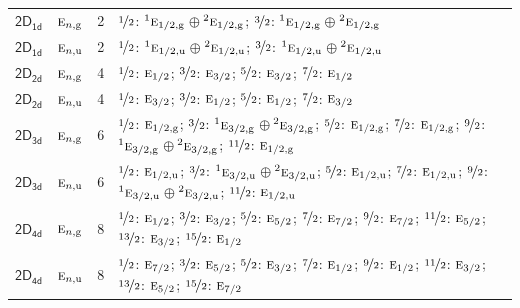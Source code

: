 \documentclass[10pt,a4paper]{article}
\numberwithin{equation}{section}
\newcommand{\grp}[1]{\mathsf{#1}}
\newcommand{\irr}[1]{\text{\normalfont\scshape #1}}
\newcommand{\conjpair}[1]{{}^{#1}}
\newcommand{\ptag}[1]{\mathrm{#1}}
\newlength{\fillwidth}\newlength{\cellwidth}\newlength{\colwidth}
\begin{document}
{\begin{longtable}{@{}llr>{\RaggedRight\arraybackslash}p{\fillwidth}@{}}
\href{2D1d.pdf}{$\grp{2D_{1d}}$} & $\irr{e}_{n,\ptag{g}}$ & 2 & $\nicefrac{1}{2}$: $\conjpair{1}\irr{e}_{1/2,\ptag{g}}$${}\oplus{}$$\conjpair{2}\irr{e}_{1/2,\ptag{g}}$; $\nicefrac{3}{2}$: $\conjpair{1}\irr{e}_{1/2,\ptag{g}}$${}\oplus{}$$\conjpair{2}\irr{e}_{1/2,\ptag{g}}$\\
\href{2D1d.pdf}{$\grp{2D_{1d}}$} & $\irr{e}_{n,\ptag{u}}$ & 2 & $\nicefrac{1}{2}$: $\conjpair{1}\irr{e}_{1/2,\ptag{u}}$${}\oplus{}$$\conjpair{2}\irr{e}_{1/2,\ptag{u}}$; $\nicefrac{3}{2}$: $\conjpair{1}\irr{e}_{1/2,\ptag{u}}$${}\oplus{}$$\conjpair{2}\irr{e}_{1/2,\ptag{u}}$\\
\href{2D2d.pdf}{$\grp{2D_{2d}}$} & $\irr{e}_{n,\ptag{g}}$ & 4 & $\nicefrac{1}{2}$: $\irr{e}_{1/2}$; $\nicefrac{3}{2}$: $\irr{e}_{3/2}$; $\nicefrac{5}{2}$: $\irr{e}_{3/2}$; $\nicefrac{7}{2}$: $\irr{e}_{1/2}$\\
\href{2D2d.pdf}{$\grp{2D_{2d}}$} & $\irr{e}_{n,\ptag{u}}$ & 4 & $\nicefrac{1}{2}$: $\irr{e}_{3/2}$; $\nicefrac{3}{2}$: $\irr{e}_{1/2}$; $\nicefrac{5}{2}$: $\irr{e}_{1/2}$; $\nicefrac{7}{2}$: $\irr{e}_{3/2}$\\
\href{2D3d.pdf}{$\grp{2D_{3d}}$} & $\irr{e}_{n,\ptag{g}}$ & 6 & $\nicefrac{1}{2}$: $\irr{e}_{1/2,\ptag{g}}$; $\nicefrac{3}{2}$: $\conjpair{1}\irr{e}_{3/2,\ptag{g}}$${}\oplus{}$$\conjpair{2}\irr{e}_{3/2,\ptag{g}}$; $\nicefrac{5}{2}$: $\irr{e}_{1/2,\ptag{g}}$; $\nicefrac{7}{2}$: $\irr{e}_{1/2,\ptag{g}}$; $\nicefrac{9}{2}$: $\conjpair{1}\irr{e}_{3/2,\ptag{g}}$${}\oplus{}$$\conjpair{2}\irr{e}_{3/2,\ptag{g}}$; $\nicefrac{11}{2}$: $\irr{e}_{1/2,\ptag{g}}$\\
\href{2D3d.pdf}{$\grp{2D_{3d}}$} & $\irr{e}_{n,\ptag{u}}$ & 6 & $\nicefrac{1}{2}$: $\irr{e}_{1/2,\ptag{u}}$; $\nicefrac{3}{2}$: $\conjpair{1}\irr{e}_{3/2,\ptag{u}}$${}\oplus{}$$\conjpair{2}\irr{e}_{3/2,\ptag{u}}$; $\nicefrac{5}{2}$: $\irr{e}_{1/2,\ptag{u}}$; $\nicefrac{7}{2}$: $\irr{e}_{1/2,\ptag{u}}$; $\nicefrac{9}{2}$: $\conjpair{1}\irr{e}_{3/2,\ptag{u}}$${}\oplus{}$$\conjpair{2}\irr{e}_{3/2,\ptag{u}}$; $\nicefrac{11}{2}$: $\irr{e}_{1/2,\ptag{u}}$\\
\href{2D4d.pdf}{$\grp{2D_{4d}}$} & $\irr{e}_{n,\ptag{g}}$ & 8 & $\nicefrac{1}{2}$: $\irr{e}_{1/2}$; $\nicefrac{3}{2}$: $\irr{e}_{3/2}$; $\nicefrac{5}{2}$: $\irr{e}_{5/2}$; $\nicefrac{7}{2}$: $\irr{e}_{7/2}$; $\nicefrac{9}{2}$: $\irr{e}_{7/2}$; $\nicefrac{11}{2}$: $\irr{e}_{5/2}$; $\nicefrac{13}{2}$: $\irr{e}_{3/2}$; $\nicefrac{15}{2}$: $\irr{e}_{1/2}$\\
\href{2D4d.pdf}{$\grp{2D_{4d}}$} & $\irr{e}_{n,\ptag{u}}$ & 8 & $\nicefrac{1}{2}$: $\irr{e}_{7/2}$; $\nicefrac{3}{2}$: $\irr{e}_{5/2}$; $\nicefrac{5}{2}$: $\irr{e}_{3/2}$; $\nicefrac{7}{2}$: $\irr{e}_{1/2}$; $\nicefrac{9}{2}$: $\irr{e}_{1/2}$; $\nicefrac{11}{2}$: $\irr{e}_{3/2}$; $\nicefrac{13}{2}$: $\irr{e}_{5/2}$; $\nicefrac{15}{2}$: $\irr{e}_{7/2}$\\

\end{longtable}}
\end{document}
